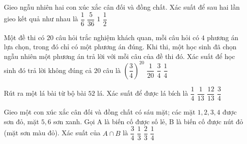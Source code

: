 \begin{ex}%
	Gieo ngẫu nhiên hai con xúc xắc cân đối và đồng chất. Xác suất để sau hai lần gieo kết quả như nhau là
	\choice
	{\True $\dfrac{1}{6}$}
	{$\dfrac{5}{36}$}
	{$1$}
	{$\dfrac{1}{2}$}
\end{ex}

\begin{ex}%
	Một đề thi có $20$ câu hỏi trắc nghiệm khách quan, mỗi câu hỏi có $4$ phương án lựa chọn, trong đó chỉ có một phương án đúng. Khi thi, một học sinh đã chọn ngẫu nhiên một phương án trả lời với mỗi câu của đề thi đó. Xác suất để học sinh đó trả lời không đúng cả $20$ câu là
	\choice
	{\True $\left(\dfrac{3}{4}\right)^{20}$}
	{$\dfrac{1}{20}$}
	{$\dfrac{3}{4}$}
	{$\dfrac{1}{4}$}
\end{ex}

\begin{ex}%
	Rút ra một lá bài từ bộ bài $52$ lá. Xác suất để được lá bích là
	\choice
	{\True $\dfrac{1}{4}$}
	{$\dfrac{1}{13}$}
	{$\dfrac{12}{13}$}
	{$\dfrac{3}{4}$}
\end{ex}

\begin{ex}%
	Gieo một con xúc xắc cân đối và đồng chất có sáu mặt;  các mặt $1, 2, 3, 4$ được sơn đỏ, mặt $5, 6$ sơn xanh. Gọi A là biến cố được số lẻ, B là biến cố được nút đỏ (mặt sơn màu đỏ). Xác suất của $A \cap B$ là
	\choice
	{$\dfrac{3}{4}$}
	{\True $\dfrac{1}{3}$}
	{$\dfrac{2}{3}$}
	{$\dfrac{1}{4}$}
\end{ex}


